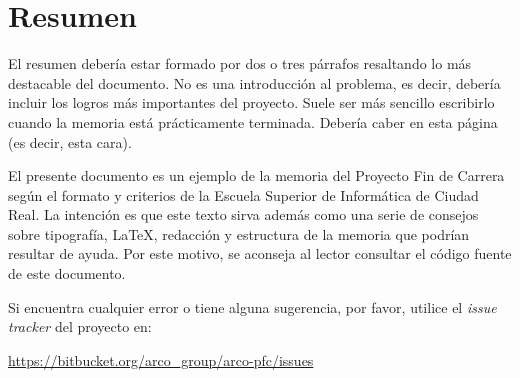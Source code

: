
\chapter{Resumen}

El resumen debería estar formado por dos o tres párrafos resaltando lo más
destacable del documento. No es una introducción al problema, es decir, debería
incluir los logros más importantes del proyecto. Suele ser más sencillo
escribirlo cuando la memoria está prácticamente terminada. Debería caber en esta
página (es decir, esta cara).

El presente documento es un ejemplo de la memoria del Proyecto Fin de Carrera según el
formato y criterios de la Escuela Superior de Informática de Ciudad Real. La intención es
que este texto sirva además como una serie de consejos sobre tipografía, \LaTeX, redacción
y estructura de la memoria que podrían resultar de ayuda. Por este motivo, se aconseja al
lector consultar el código fuente de este documento.

Si encuentra cualquier error o tiene alguna sugerencia, por favor, utilice
el \emph{issue tracker} del proyecto \arcopfc{} en:

\url{https://bitbucket.org/arco_group/arco-pfc/issues}


